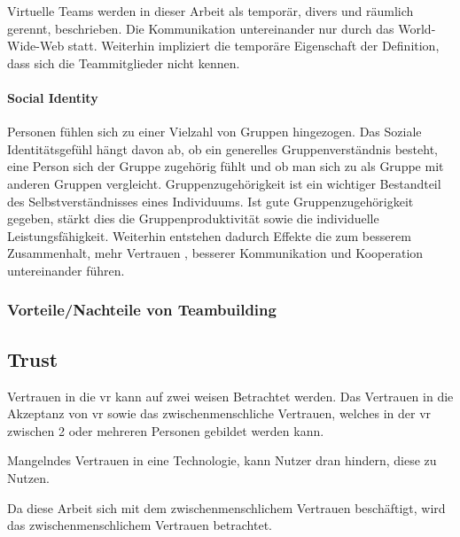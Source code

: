 \documentclass[a4paper,11pt]{article}%
\renewcommand{\\}{\vspace*{0.5\baselineskip} \newline}
\begin{document}
{Virtuelle Teams werden in dieser Arbeit als temporär, divers und räumlich gerennt, beschrieben. Die Kommunikation untereinander nur durch das World-Wide-Web statt. Weiterhin impliziert die temporäre Eigenschaft der Definition, dass sich die Teammitglieder nicht kennen.
		
		\paragraph{Social Identity}
		Personen fühlen sich zu einer Vielzahl von Gruppen hingezogen. Das Soziale Identitätsgefühl hängt davon ab, ob ein generelles Gruppenverständnis besteht, eine Person sich der Gruppe zugehörig fühlt und ob man sich zu als Gruppe mit anderen Gruppen vergleicht. Gruppenzugehörigkeit ist ein wichtiger Bestandteil des Selbstverständnisses eines Individuums. \citep{sutantovicious}
		Ist gute Gruppenzugehörigkeit gegeben, stärkt dies die Gruppenproduktivität sowie die individuelle Leistungsfähigkeit. Weiterhin entstehen dadurch Effekte die zum besserem Zusammenhalt, mehr Vertrauen \citep{herbsleb2000distance}, besserer Kommunikation und Kooperation untereinander führen. \citep[p. 510]{olson2003psychological}
		
		
		\subsubsection{Vorteile/Nachteile von Teambuilding}
		
		\subsection{Trust}
Vertrauen in die \ac{vr} kann auf zwei weisen Betrachtet werden. Das Vertrauen in die Akzeptanz von \ac{vr} sowie das zwischenmenschliche Vertrauen, welches in der \ac{vr} zwischen 2 oder mehreren Personen gebildet werden kann.

Mangelndes Vertrauen in eine Technologie, kann Nutzer dran hindern, diese zu Nutzen. \citep{trustInVRTechnology}

Da diese Arbeit sich mit dem zwischenmenschlichem Vertrauen beschäftigt, wird das zwischenmenschlichem Vertrauen betrachtet.
}
\end{document}
